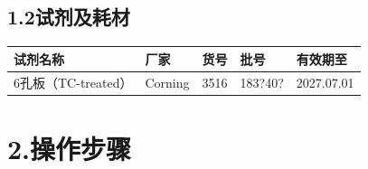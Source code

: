 \documentclass[UTF8,10pt,a4paper,fontset=fandol]{ctexart}
\newcommand{\fieldvalue}[1]{#1}
\newcommand{\handwritten}[1]{#1}
\begin{document}
\subsection*{1.2\quad 试剂及耗材}

\begin{center}
\begin{tabular}{|p{5cm}|p{3cm}|p{3cm}|p{3cm}|p{3cm}|}
\hline
试剂名称 & 厂家 & 货号 & 批号 & 有效期至\\
\hline
\fieldvalue{6孔板（TC-treated）} &
\fieldvalue{Corning} &
\fieldvalue{3516} &
\fieldvalue{\handwritten{183?40?}} &
\fieldvalue{\handwritten{2027.07.01}}\\
\hline
\end{tabular}
\end{center}

\section*{2.\quad 操作步骤}
\end{document}
